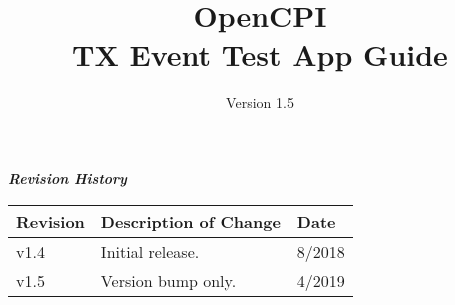 \iffalse
This file is protected by Copyright. Please refer to the COPYRIGHT file
distributed with this source distribution.

This file is part of OpenCPI <http://www.opencpi.org>

OpenCPI is free software: you can redistribute it and/or modify it under the
terms of the GNU Lesser General Public License as published by the Free Software
Foundation, either version 3 of the License, or (at your option) any later
version.

OpenCPI is distributed in the hope that it will be useful, but WITHOUT ANY
WARRANTY; without even the implied warranty of MERCHANTABILITY or FITNESS FOR A
PARTICULAR PURPOSE. See the GNU Lesser General Public License for more details.

You should have received a copy of the GNU Lesser General Public License along
with this program. If not, see <http://www.gnu.org/licenses/>.
\fi

\def\docTitle{OpenCPI\\ TX Event Test App Guide}
\def\docVersion{1.5}

\date{Version \docVersion} %
\title{\docTitle}
\usepackage{graphicx}
\graphicspath{ {figures/} }
\usepackage{textcomp}
\usepackage{listings}


\maketitle
	\begin{center}
	\textit{\textbf{Revision History}}
		\begin{table}[H]
		\label{table:revisions} %
\begin{longtable}{|p{}
                  |p{}
                  |p{}|}
			\hline
			\rowcolor{blue}
			\textbf{Revision} & \textbf{Description of Change} & \textbf{Date} \\
		    \hline
		    v1.4 & Initial release. & 8/2018 \\
		    \hline
		    v1.5 & Version bump only. & 4/2019 \\
			\hline
			\end{longtable}
		\end{table}
	\end{center}

